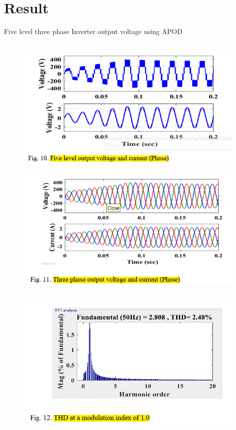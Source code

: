 \documentclass[
	11pt, %
]{beamer}
\begin{document}
\section{Result}
\begin{frame}{Five level three phase Inverter output voltage using APOD}
	\begin{column}{0.5\textwidth}
		\begin{figure}
			\includegraphics[width=1\linewidth]{APOD_V_C.png}
		\end{figure}
		\begin{figure}
			\includegraphics[width=1\linewidth]{APOD_V_C_3.png}
		\end{figure}
	\end{column}
	\begin{column}{0.5\textwidth}
		\begin{figure}
			\includegraphics[width=1\linewidth]{APOD_THD.png}

\end{figure}
\end{column}
\end{frame}
\end{document}
